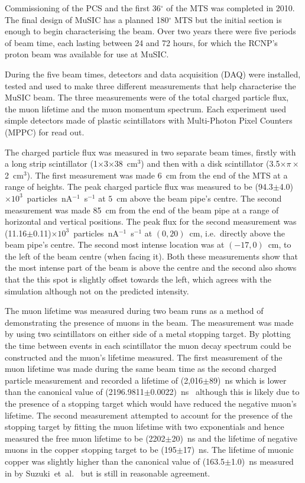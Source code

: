 Commissioning of the PCS and the first 36\(^{\circ}\) of the MTS was completed in 2010. The final design of MuSIC has a planned 180\(^{\circ}\) MTS but the initial section is enough to begin characterising the beam. Over two years there were five periods of beam time, each lasting between 24 and 72 hours, for which the RCNP's proton beam was available for use at MuSIC. 

During the five beam times, detectors and data acquisition (DAQ) were installed, tested and used to make three different measurements that help characterise the MuSIC beam. The three measurements were of the total charged particle flux, the muon lifetime and the muon momentum spectrum. Each experiment used simple detectors made of plastic scintillators with Multi-Photon Pixel Counters (MPPC) for read out. 

The charged particle flux was measured in two separate beam times, firstly with a long strip scintillator (1\(\times\)3\(\times\)38~cm\(^3\)) and then with a disk scintillator (3.5\(\times \pi \times\)2~cm\(^3\)). The first measurement was made 6~cm from the end of the MTS at a range of heights. The peak charged particle flux was measured to be (94.3\(\pm\)4.0)\(\times10^3\)~particles~nA\(^{-1}\)~s\(^{-1}\) at \(5\)~cm above the beam pipe's centre. The second measurement was made 85~cm from the end of the beam pipe at a range of horizontal and vertical positions. The peak flux for the second measurement was (11.16\(\pm\)0.11)\(\times10^3\)~particles~nA\(^{-1}\)~s\(^{-1}\) at \((0, 20)\)~cm, i.e.\ directly above the beam pipe's centre. The second most intense location was at \((-17, 0)\)~cm, to the left of the beam centre (when facing it). Both these measurements show that the most intense part of the beam is above the centre and the second also shows that the this spot is slightly offset towards the left, which agrees with the simulation although not on the predicted intensity.

The muon lifetime was measured during two beam runs as a method of demonstrating the presence of muons in the beam. The measurement was made by using two scintillators on either side of a metal stopping target. By plotting the time between events in each scintillator the muon decay spectrum could be constructed and the muon's lifetime measured. The first measurement of the muon lifetime was made during the same beam time as the second charged particle measurement and recorded a lifetime of (2,016\(\pm\)89)~ns which is lower than the canonical value of (2196.9811\(\pm\)0.0022)~ns~\cite{pdg} although this is likely due to the presence of a stopping target which would have reduced the negative muon's lifetime. The second measurement attempted to account for the presence of the stopping target by fitting the muon lifetime with two exponentials and hence measured the free muon lifetime to be (2202\(\pm\)20)~ns and the lifetime of negative muons in the copper stopping target to be (195\(\pm\)17)~ns. The lifetime of muonic copper was slightly higher than the canonical value of (163.5\(\pm\)1.0)~ns measured in by Suzuki~et~al.~\cite{suzuki_mu_capture_rates} but is still in reasonable agreement.

